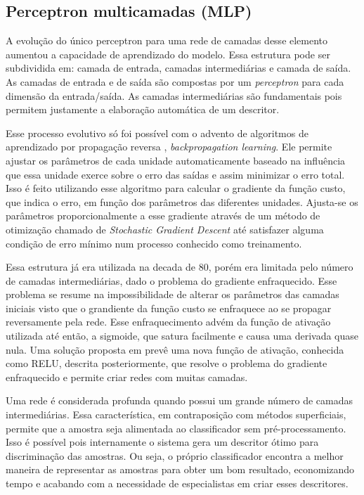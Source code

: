 \subsection{Perceptron multicamadas (MLP)}
A evolução do único perceptron para uma rede de camadas desse elemento aumentou a capacidade de aprendizado do modelo. Essa estrutura pode ser subdividida em: camada de entrada, camadas intermediárias e camada de saída. As camadas de entrada e de saída são compostas por um \textit{perceptron} para cada dimensão da entrada/saída. As camadas intermediárias são fundamentais pois permitem justamente a elaboração automática de um descritor.

Esse processo evolutivo só foi possível com o advento de algoritmos de aprendizado por propagação reversa \cite{backpropagation}, \textit{backpropagation learning}. Ele  permite ajustar os parâmetros de cada unidade automaticamente baseado na influência que essa unidade exerce sobre o erro das saídas e assim minimizar o erro total. Isso é feito utilizando esse algoritmo para calcular o gradiente da função custo, que indica o erro, em função dos parâmetros das diferentes unidades. Ajusta-se os parâmetros proporcionalmente a esse gradiente através de um método de otimização chamado de \textit{Stochastic Gradient Descent} até satisfazer alguma condição de erro mínimo num processo conhecido como treinamento.

Essa estrutura já era utilizada na decada de 80, porém era limitada pelo número de camadas intermediárias, dado o problema do gradiente enfraquecido. Esse problema se resume na impossibilidade de alterar os parâmetros das camadas iniciais visto que o grandiente da função custo se enfraquece ao se propagar reversamente pela rede. Esse enfraquecimento advém da função de ativação utilizada até então, a sigmoide, que satura facilmente e causa uma derivada quase nula. Uma solução proposta em \cite{nair2010relu} prevê uma nova função de ativação, conhecida como RELU, descrita posteriormente, que resolve o problema do gradiente enfraquecido e permite criar redes com muitas camadas.

Uma rede é considerada profunda quando possui um grande número de camadas intermediárias. Essa característica, em contraposição com métodos superficiais, permite que a amostra seja alimentada ao classificador sem pré-processamento. Isso é possível pois internamente o sistema gera um descritor ótimo para discriminação das amostras. Ou seja, o próprio classificador encontra a melhor maneira de representar as amostras para obter um bom resultado, economizando tempo e acabando com a necessidade de especialistas em criar esses descritores.

